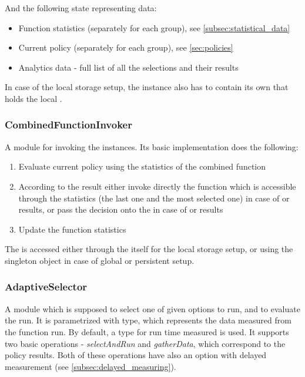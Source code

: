 And the following state representing data:

\begin{itemize}
	\item Function statistics (separately for each group), see \ref{subsec:statistical_data}
	\item Current policy (separately for each group), see \ref{sec:policies}
	\item Analytics data - full list of all the selections and their results
\end{itemize}

In case of the local storage setup, the instance also has to contain its own  that holds the local .

\subsubsection{CombinedFunctionInvoker}

A module for invoking the  instances. Its basic implementation does the following:

\begin{enumerate}
	\item Evaluate current policy using the statistics of the combined function
	\item According to the result either invoke directly the function which is accessible through the statistics (the last one and the most selected one) in case of  or  results, or pass the decision onto the  in case of  or  results
	\item Update the function statistics
\end{enumerate}

The  is accessed either through the  itself for the local storage setup, or using the singleton object  in case of global or persistent setup.

\subsubsection{AdaptiveSelector}

A module which is supposed to select one of given options to run, and to evaluate the run. It is parametrized with  type, which represents the data measured from the function run. By default, a  type for run time measured is used. It supports two basic operations - \textit{selectAndRun} and \textit{gatherData}, which correspond to the policy results. Both of these operations have also an option with delayed measurement (see \ref{subsec:delayed_measuring}).

